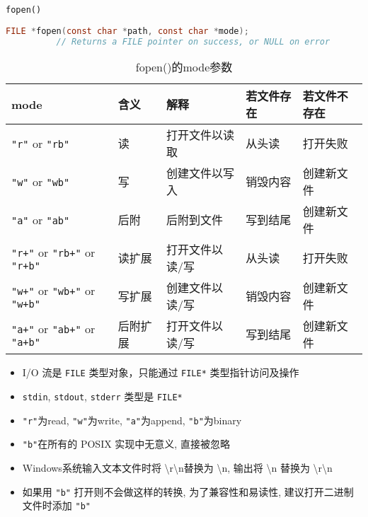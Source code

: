 \begin{frame}[fragile]{\texttt{fopen()}}
    \scriptsize
    \begin{lstlisting}[language=c]
        FILE *fopen(const char *path, const char *mode);
          // Returns a FILE pointer on success, or NULL on error
    \end{lstlisting}
    \begin{table}[]
        \begin{tabular}{|l|l|l|l|l|}
            \hline
            mode & 含义 & 解释 & 若文件存在 & 若文件不存在 \\ \hline
            \texttt{"r"} or \texttt{"rb"} & 读 & 打开文件以读取 & 从头读 & 打开失败 \\ \hline
            \texttt{"w"} or \texttt{"wb"} & 写 & 创建文件以写入 & 销毁内容 & 创建新文件 \\ \hline
            \texttt{"a"} or \texttt{"ab"} & 后附 & 后附到文件 & 写到结尾 & 创建新文件 \\ \hline
            \texttt{"r+"} or \texttt{"rb+"} or \texttt{"r+b"} & 读扩展 & 打开文件以读/写 & 从头读 & 打开失败 \\ \hline
            \texttt{"w+"} or \texttt{"wb+"} or \texttt{"w+b"} & 写扩展 & 创建文件以读/写 & 销毁内容 & 创建新文件 \\ \hline
            \texttt{"a+"} or \texttt{"ab+"} or \texttt{"a+b"} & 后附扩展 & 打开文件以读/写 & 写到结尾 & 创建新文件 \\ \hline
        \end{tabular}
        \caption{fopen()的mode参数}
    \end{table}
    \footnotesize
    \begin{itemize}[<+- | alert@+>]
        \item I/O 流是 \texttt{FILE} 类型对象，只能通过 \texttt{FILE*} 类型指针访问及操作
        \item \texttt{stdin}, \texttt{stdout}, \texttt{stderr} 类型是 \texttt{FILE*}
        \item \texttt{"r"}为read, \texttt{"w"}为write, \texttt{"a"}为append, \texttt{"b"}为binary
        \item \texttt{"b"}在所有的 POSIX 实现中无意义, 直接被忽略
        \item Windows系统输入文本文件时将 \textbackslash r\textbackslash n替换为 \textbackslash n, 输出将 \textbackslash n 替换为 \textbackslash r\textbackslash n
        \item 如果用 \texttt{"b"} 打开则不会做这样的转换, 为了兼容性和易读性, 建议打开二进制文件时添加 \texttt{"b"}
    \end{itemize}
\end{frame}

